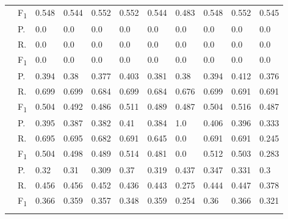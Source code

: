\begin{tabularx}{\textwidth}{p{1.3em}l Z  Z  Z  Z  Z  Z  Z  Z  Z }
                & F\textsubscript{1}     & 0.548         & 0.544         & 0.552         & 0.552         & 0.544         & 0.483         & 0.548         & 0.552         & 0.545         \\
                     \midrule     {}
                & P.                     & 0.0  & 0.0  & 0.0  & 0.0  & 0.0  & 0.0  & 0.0  & 0.0  & 0.0  \\
                & R.                     & 0.0     & 0.0     & 0.0     & 0.0     & 0.0     & 0.0     & 0.0     & 0.0     & 0.0     \\
                & F\textsubscript{1}     & 0.0         & 0.0         & 0.0         & 0.0         & 0.0         & 0.0         & 0.0         & 0.0         & 0.0         \\
                     \midrule     {}
                & P.                     & 0.394  & 0.38  & 0.377  & 0.403  & 0.381  & 0.38  & 0.394  & 0.412  & 0.376  \\
                & R.                     & 0.699     & 0.699     & 0.684     & 0.699     & 0.684     & 0.676     & 0.699     & 0.691     & 0.691     \\
                & F\textsubscript{1}     & 0.504         & 0.492         & 0.486         & 0.511         & 0.489         & 0.487         & 0.504         & 0.516         & 0.487         \\
                     \midrule     {}
                & P.                     & 0.395  & 0.387  & 0.382  & 0.41  & 0.384  & 1.0  & 0.406  & 0.396  & 0.333  \\
                & R.                     & 0.695     & 0.695     & 0.682     & 0.691     & 0.645     & 0.0     & 0.691     & 0.691     & 0.245     \\
                & F\textsubscript{1}     & 0.504         & 0.498         & 0.489         & 0.514         & 0.481         & 0.0         & 0.512         & 0.503         & 0.283         \\
                     \midrule     {}
                & P.                     & 0.32  & 0.31  & 0.309  & 0.37  & 0.319  & 0.437  & 0.347  & 0.331  & 0.3  \\
                & R.                     & 0.456     & 0.456     & 0.452     & 0.436     & 0.443     & 0.275     & 0.444     & 0.447     & 0.378     \\
                & F\textsubscript{1}     & 0.366         & 0.359         & 0.357         & 0.348         & 0.359         & 0.254         & 0.36         & 0.366         & 0.321         \\
                     \midrule     {}
\end{tabularx}